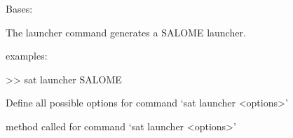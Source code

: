 \documentclass[a4paper,10pt,english]{sphinxmanual}
\begin{document}
\begin{fulllineitems}
\label{\detokenize{apidoc_commands/commands:commands.launcher.Command}}
Bases: 

The launcher command generates a SALOME launcher.

\begin{DUlineblock}{0em}
\item[] examples:
\item[] \textgreater{}\textgreater{} sat launcher SALOME 
\end{DUlineblock}

\begin{fulllineitems}
\label{\detokenize{apidoc_commands/commands:commands.launcher.Command.getParser}}
Define all possible options for command ‘sat launcher \textless{}options\textgreater{}’

\end{fulllineitems}


\begin{fulllineitems}
\label{\detokenize{apidoc_commands/commands:commands.launcher.Command.name}}
\end{fulllineitems}


\begin{fulllineitems}
\label{\detokenize{apidoc_commands/commands:commands.launcher.Command.run}}
method called for command ‘sat launcher \textless{}options\textgreater{}’

\end{fulllineitems}


\end{fulllineitems}

\end{document}
